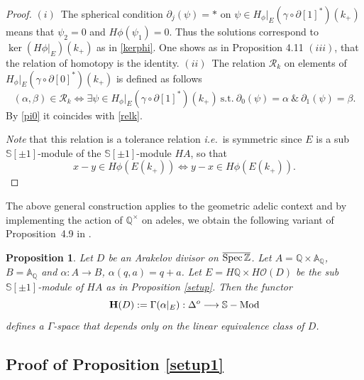\documentclass[cupthm]{CUP-JNL-JMJ}
\numberwithin{equation}{section}
\theoremstyle{cupplain}
\newtheorem{proposition}[theorem]{Proposition}
\theoremstyle{cupdefinition}
\theoremstyle{cupremark}
\theoremstyle{cupproof}
\newtheorem{proof}{Proof}
\def\A{{\mathbb A}}
\def\Q{{\mathbb Q}}
\def\S{{\mathbb S}}
\def\Z{{\mathbb Z}}
\def\cO{{\mathcal O}}
\def\cR{{\mathcal R}}
\def\bfh{{\bf H}}
\def\Spec{{\rm Spec\,}}
\def\sss{{\S}}
\def\spm{{\sss[\pm 1]}}
\def\dop{{\Delta^o}}
\def\smod{{\sss-{\rm{Mod}}}}
\def\spzb{{\overline{\Spec\Z}}}
\newcommand{\ie}{{\it i.e.\/}\ }
\begin{document}
\begin{appendix}
\begin{proof}
$(i)$~The spherical condition $\partial_j(\psi)=*$ on  $\psi\in H_\phi\vert_E(\gamma\circ\partial[1]^*)(k_+)$ means that $\psi_2=0$ and $H\phi(\psi_1)=0$. Thus the solutions  correspond to $\ker(H\phi\vert_E)(k_+)$ as in \eqref{kerphi}. One shows as in \cite{CCAtiyah} Proposition 4.11 $(iii)$, that the relation of homotopy is the identity.\newline
$(ii)$~The relation $\cR_k$ on elements of $H_\phi\vert_E(\gamma\circ\partial[0]^*)(k_+)$ is defined as follows
\begin{equation}\label{pizeroR}
(\alpha,\beta)\in \cR_k\iff \exists 	\psi \in H_\phi\vert_E(\gamma\circ\partial[1]^*)(k_+)~\text{s.t.}~\partial_0(\psi)=\alpha \  \& \ \partial_1(\psi)=\beta.
\end{equation}
By \eqref{pi0} it coincides with \eqref{relk}.\vspace{.03in}

 \emph{Note} that this relation is a tolerance relation \ie is  symmetric since $E$ is a sub $\spm$-module of the $\spm$-module $HA$, so that 
\[
x-y\in H\phi(E(k_+))\iff y-x\in H\phi(E(k_+)).
\]
\end{proof}
\vspace{.1in}

The above general construction applies to the geometric adelic context and by implementing the action of $\Q^\times$ on adeles, we obtain the following variant of  Proposition~4.9 in \cite{CCAtiyah}.

 \begin{proposition}\label{bfhd} Let  $D$ be an Arakelov divisor on $\spzb$. Let $A=\Q \times \A_\Q$, $B=\A_\Q$ and $\alpha:A \to B$, $\alpha(q,a) = q+ a$. Let  $E= H\Q\times H\cO(D)$ be the sub $\spm$-module of $HA$ as in Proposition \ref{setup}. 
 	Then the  functor  
\begin{equation}\label{propgam0}
\bfh(D):=\Gamma(\alpha\vert_E): \dop \longrightarrow \smod
\end{equation}
defines a $\Gamma$-space
  that depends only on the  linear equivalence class of $D$.
 \end{proposition}
 
 \subsection{Proof of Proposition \ref{setup1}} \label{sectproofprop}
 

\end{appendix}
\end{document}
